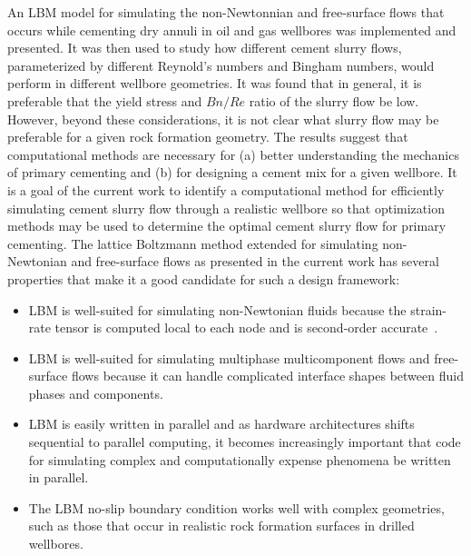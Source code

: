 \documentclass[pdftex,ms]{pittetd}
\begin{document}
An LBM model for simulating the non-Newtonnian and free-surface flows that occurs while cementing dry annuli in oil and gas wellbores was implemented and presented.
It was then used to study how different cement slurry flows, parameterized by different Reynold's numbers and Bingham numbers, would perform in different wellbore geometries.
It was found that in general, it is preferable that the yield stress and $Bn / Re$ ratio of the slurry flow be low.
However, beyond these considerations, it is not clear what slurry flow may be preferable for a given rock formation geometry.
The results suggest that computational methods are necessary for (a) better understanding the mechanics of primary cementing and (b) for designing a cement mix for a given wellbore.
It is a goal of the current work to identify a computational method for efficiently simulating cement slurry flow through a realistic wellbore so that optimization methods may be used to determine the optimal cement slurry flow for primary cementing.
The lattice Boltzmann method extended for simulating non-Newtonian and free-surface flows as presented in the current work has several properties that make it a good candidate for such a design framework:
\begin{itemize}
\item LBM is well-suited for simulating non-Newtonian fluids because the strain-rate tensor is computed local to each node and is second-order accurate~\cite{kruger2009shear,kruger2010second}.
\item LBM is well-suited for simulating multiphase multicomponent flows and free-surface flows because it can handle complicated interface shapes between fluid phases and components.
\item LBM is easily written in parallel and as hardware architectures shifts sequential to parallel computing, it becomes increasingly important that code for simulating complex and computationally expense phenomena be written in parallel.
\item The LBM no-slip boundary condition works well with complex geometries, such as those that occur in realistic rock formation surfaces in drilled wellbores.
\end{itemize}



	
\end{document}
